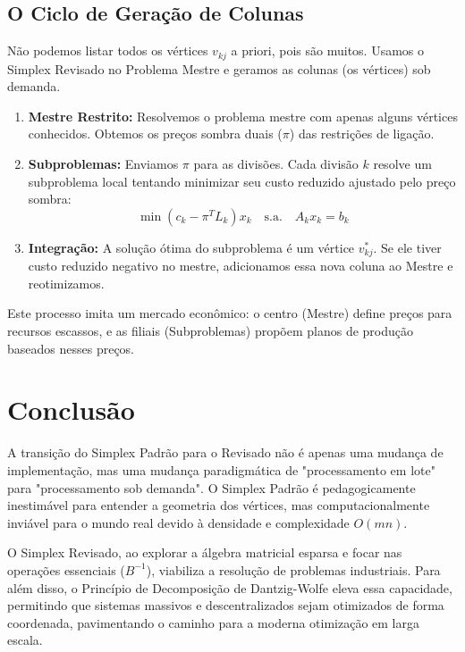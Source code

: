 \documentclass[12pt, a4paper]{article}
\begin{document}
\subsection{O Ciclo de Geração de Colunas}
Não podemos listar todos os vértices $v_{kj}$ a priori, pois são muitos. Usamos o Simplex Revisado no Problema Mestre e geramos as colunas (os vértices) sob demanda.

\begin{enumerate}
    \item \textbf{Mestre Restrito:} Resolvemos o problema mestre com apenas alguns vértices conhecidos. Obtemos os preços sombra duais ($\pi$) das restrições de ligação.
    
    \item \textbf{Subproblemas:} Enviamos $\pi$ para as divisões. Cada divisão $k$ resolve um subproblema local tentando minimizar seu custo reduzido ajustado pelo preço sombra:
    $$ \min (c_k - \pi^T L_k)x_k \quad \text{s.a.} \quad A_k x_k = b_k $$
    
    \item \textbf{Integração:} A solução ótima do subproblema é um vértice $v_{kj}^*$. Se ele tiver custo reduzido negativo no mestre, adicionamos essa nova coluna ao Mestre e reotimizamos.
\end{enumerate}

Este processo imita um mercado econômico: o centro (Mestre) define preços para recursos escassos, e as filiais (Subproblemas) propõem planos de produção baseados nesses preços.

\section{Conclusão}
A transição do Simplex Padrão para o Revisado não é apenas uma mudança de implementação, mas uma mudança paradigmática de "processamento em lote" para "processamento sob demanda". O Simplex Padrão é pedagogicamente inestimável para entender a geometria dos vértices, mas computacionalmente inviável para o mundo real devido à densidade e complexidade $O(mn)$.

O Simplex Revisado, ao explorar a álgebra matricial esparsa e focar nas operações essenciais ($B^{-1}$), viabiliza a resolução de problemas industriais. Para além disso, o Princípio de Decomposição de Dantzig-Wolfe eleva essa capacidade, permitindo que sistemas massivos e descentralizados sejam otimizados de forma coordenada, pavimentando o caminho para a moderna otimização em larga escala.
\end{document}
